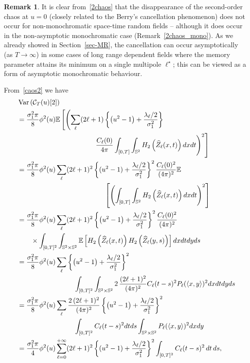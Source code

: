 \documentclass[10pt]{amsart}
\theoremstyle{definition}\newtheorem{defi}[theo]{Definition}\newtheorem{rema}[theo]{Remark}\newtheorem{exam}[theo]{Example}\newtheorem{exem}[theo]{Example}\newtheorem{nota}[theo]{Notation}
\newcommand{\clC}{\mathcal{C}}
\newcommand{\bbS}{\mathbb{S}}
\newcommand{\bbE}{\mathbb{E}}
\DeclareMathOperator{\Var}{Var}
\begin{document}
\begin{rema}
It is clear from~\eqref{2chaos} that the disappearance of the second-order chaos at $u=0$ (closely related to the Berry's cancellation phenomenon) does not occur for non-monochromatic space-time random fields -- although it does occur in the non-asymptotic monochromatic case (Remark~\ref {2chaos_mono}). As we already showed in Section~\ref{sec-MR}, the cancellation can occur asymptotically (as $T\rightarrow \infty $) in some cases of long range dependent fields where the memory parameter attains its minimum on a single multipole $\ell^{\star}$; this can be viewed as a form of asymptotic monochromatic behaviour.
\end{rema}

From~\eqref{caos2} we have
\begingroup
\allowdisplaybreaks
\begin{align}\label{varlunga2}
&\Var\left(\clC_{T}(u)[2]\right)\\
&=\frac{\sigma _{1}^{2}\pi }{8}\phi ^{2}(u)\bbE\left[\left(
\sum_{\ell }(2\ell +1)\left\{\left(u^{2}-1\right)+\frac{\lambda _{\ell }/2}{\sigma _{1}^{2}}\right\}\right.\right.\nonumber\\
&\mkern200mu\left.\left.\frac{C_{\ell }(0)}{4\pi }\int_{[0,T]}\int_{\bbS^{2}}H_{2}\left(\widehat{Z}_{\ell }(x,t)\right)dxdt\right) ^{2}\right]\nonumber\\
&=\frac{\sigma _{1}^{2}\pi }{8}\phi ^{2}(u)\sum_{\ell }(2\ell +1)^{2}\left\{ (u^{2}-1)+\frac{\lambda _{\ell }/2}{\sigma _{1}^{2}}\right\} ^{2}\frac{C_{\ell }(0)^{2}}{(4\pi)^{2}}\bbE\nonumber\\
&\mkern230mu\left[\left(
\int_{[0,T]}\int_{\bbS^{2}}H_{2}\left(\widehat{Z}_{\ell }(x,t)\right)dxdt\right) ^{2}\right]\nonumber\\
&=\frac{\sigma _{1}^{2}\pi }{8}\phi ^{2}(u)\sum_{\ell }(2\ell +1)^{2}\left\{\left(u^{2}-1\right)+\frac{\lambda _{\ell }/2}{\sigma _{1}^{2}}\right\} ^{2}\frac{C_{\ell }(0)^{2}}{(4\pi)^{2}}\nonumber\\
&\qquad\times \int_{[0,T]^{2}}\int_{\bbS^{2}\times \bbS^{2}}\bbE\left[H_{2}\left(\widehat{Z}_{\ell }(x,t)\right)H_{2}\left(\widehat{Z}_{\ell }(y,s)\right)\right] dxdtdyds\nonumber\\
&=\frac{\sigma _{1}^{2}\pi }{8}\phi ^{2}(u)\sum_{\ell }\left\{\left(u^{2}-1\right)+\frac{\lambda _{\ell }/2}{\sigma _{1}^{2}}\right\} ^{2}\nonumber\\
&\mkern150mu\int_{[0,T]^{2}}\int_{\bbS^{2}\times \bbS^{2}}2\,\frac{(2\ell +1)^{2}}{(4\pi)^{2}}C_{\ell }(t-s)^{2}P_{\ell }(\langle x,y\rangle)^{2}dxdtdyds\nonumber\\
&=\frac{\sigma _{1}^{2}\pi }{8}\phi ^{2}(u)\sum_{\ell }\frac{2\,(2\ell +1)^{2}}{(4\pi)^{2}}\left\{\left(u^{2}-1\right)+\frac{\lambda _{\ell }/2}{\sigma _{1}^{2}}\right\} ^{2}\nonumber\\
&\mkern150mu\int_{[0,T]^{2}}C_{\ell }(t-s)^{2}dtds\int_{\bbS^{2}\times \bbS^{2}}P_{\ell }(\langle x,y\rangle)^{2}dxdy\nonumber\\
&=\frac{\sigma _{1}^{2}\pi }{4}\phi ^{2}(u)\sum_{\ell =0}^{+\infty}(2\ell +1)^{2}\left\{ (u^{2}-1)+\frac{\lambda _{\ell }/2}{\sigma _{1}^{2}}\right\} ^{2}\int_{[0,T]^{2}}C_{\ell }(t-s)^{2}\,dt\,ds,\nonumber
\end{align}
\end{document}
